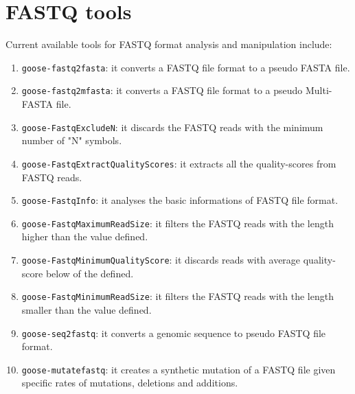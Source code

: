 \chapter{FASTQ tools}
\label{fastq}

Current available tools for FASTQ format analysis and manipulation include:
\begin{enumerate}

\item \texttt{goose-fastq2fasta}: it converts a FASTQ file format to a pseudo FASTA file.
\item \texttt{goose-fastq2mfasta}: it converts a FASTQ file format to a pseudo Multi-FASTA file.
\item \texttt{goose-FastqExcludeN}: it discards the FASTQ reads with the minimum number of "N" symbols.
\item \texttt{goose-FastqExtractQualityScores}: it extracts all the quality-scores from FASTQ reads.
\item \texttt{goose-FastqInfo}: it analyses the basic informations of FASTQ file format.
\item \texttt{goose-FastqMaximumReadSize}: it filters the FASTQ reads with the length higher than the value defined.
\item \texttt{goose-FastqMinimumQualityScore}: it discards reads with average quality-score below of the defined.
\item \texttt{goose-FastqMinimumReadSize}: it filters the FASTQ reads with the length smaller than the value defined.
\item \texttt{goose-seq2fastq}: it converts a genomic sequence to pseudo FASTQ file format.
\item \texttt{goose-mutatefastq}: it creates a synthetic mutation of a FASTQ file given specific rates of mutations, deletions and additions.




\end{enumerate}
